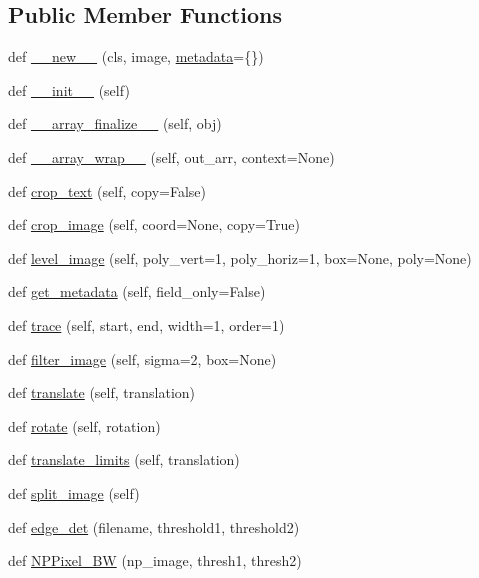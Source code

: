 \subsection*{Public Member Functions}
\begin{DoxyCompactItemize}
\item 
def \hyperlink{classkermit_1_1_kerr_array_a49510d2889f5aef6fa2c67b84396ad64}{\+\_\+\+\_\+new\+\_\+\+\_\+} (cls, image, \hyperlink{classkermit_1_1_kerr_array_a884b10ce1536dc07c4a9ac9346976c22}{metadata}=\{\})
\item 
def \hyperlink{classkermit_1_1_kerr_array_a1d0f724e476ff8264260969898f58a87}{\+\_\+\+\_\+init\+\_\+\+\_\+} (self)
\item 
def \hyperlink{classkermit_1_1_kerr_array_ae0a969a698622942ef4862904736f51b}{\+\_\+\+\_\+array\+\_\+finalize\+\_\+\+\_\+} (self, obj)
\item 
def \hyperlink{classkermit_1_1_kerr_array_adc90cc2f8a25a7366bc0e88a34758186}{\+\_\+\+\_\+array\+\_\+wrap\+\_\+\+\_\+} (self, out\+\_\+arr, context=None)
\item 
def \hyperlink{classkermit_1_1_kerr_array_ac8a4487e7a6dabd4221606d739effe73}{crop\+\_\+text} (self, copy=False)
\item 
def \hyperlink{classkermit_1_1_kerr_array_a0c5f761be9b5daff8773d8c8542c8ba8}{crop\+\_\+image} (self, coord=None, copy=True)
\item 
def \hyperlink{classkermit_1_1_kerr_array_a080a470ae97aa2b99fb2c6a9501da615}{level\+\_\+image} (self, poly\+\_\+vert=1, poly\+\_\+horiz=1, box=None, poly=None)
\item 
def \hyperlink{classkermit_1_1_kerr_array_aecac9b5c400f7397b533262865001665}{get\+\_\+metadata} (self, field\+\_\+only=False)
\item 
def \hyperlink{classkermit_1_1_kerr_array_a7007ac8134bdaccc365e7f88f2c86fa2}{trace} (self, start, end, width=1, order=1)
\item 
def \hyperlink{classkermit_1_1_kerr_array_a09a8c48b921dc96a0134475f6a945b81}{filter\+\_\+image} (self, sigma=2, box=None)
\item 
def \hyperlink{classkermit_1_1_kerr_array_aadeee0dee3e204dacf275d249b44d042}{translate} (self, translation)
\item 
def \hyperlink{classkermit_1_1_kerr_array_a0c8ee5a6ca37169116cd5bc0e70f5f43}{rotate} (self, rotation)
\item 
def \hyperlink{classkermit_1_1_kerr_array_a77d7327a33b40fe6b081b47657cc35fb}{translate\+\_\+limits} (self, translation)
\item 
def \hyperlink{classkermit_1_1_kerr_array_a8b4eaca8f105f02d3d2c4a5af46d3d13}{split\+\_\+image} (self)
\item 
def \hyperlink{classkermit_1_1_kerr_array_adbbf4ec4d3de79f7a8f44b5a4449b07a}{edge\+\_\+det} (filename, threshold1, threshold2)
\item 
def \hyperlink{classkermit_1_1_kerr_array_a5e085bfa80a26a2a16d16c2ba6f86344}{N\+P\+Pixel\+\_\+\+BW} (np\+\_\+image, thresh1, thresh2)
\end{DoxyCompactItemize}

